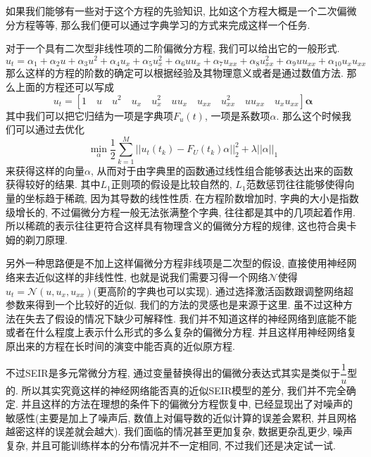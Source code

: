 \documentclass[lang=cn,11pt]{elegantpaper}
\begin{document}
如果我们能够有一些对于这个方程的先验知识, 比如这个方程大概是一个二次偏微分方程等等, 那么我们便可以通过字典学习的方式来完成这样一个任务.

对于一个具有二次型非线性项的二阶偏微分方程, 我们可以给出它的一般形式.
\large
\begin{equation}
	u_t=\alpha_1+\alpha_2u+\alpha_3u^2+\alpha_4u_x+\alpha_5u_x^2+\alpha_6uu_x+\alpha_7u_{xx}+\alpha_8u_{xx}^2+\alpha_9uu_{xx}+\alpha_{10}u_xu_{xx}
\end{equation}
\normalsize
那么这样的方程的阶数的确定可以根据经验及其物理意义或者是通过数值方法. 那么上面的方程还可以写成
\large
\begin{equation}
	u_t=[1\quad u\quad u^2\quad u_x\quad u_x^2\quad uu_x\quad u_{xx}\quad u_{xx}^2\quad uu_{xx}\quad u_xu_{xx}] \mathbf \alpha
\end{equation}
\normalsize
其中我们可以把它归结为一项是字典项$F_u(t)$, 一项是系数项$\alpha$. 那么这个时候我们可以通过去优化
\large
\begin{equation}
	\min_\alpha \dfrac{1}{2}\sum_{k=1}^M ||u_t(t_k)-F_U(t_k)\alpha||_2^2+\lambda||\alpha||_1
\end{equation}
\normalsize
来获得这样的向量$\alpha$, 从而对于由字典里的函数通过线性组合能够表达出来的函数获得较好的结果. 其中$L_1$正则项的假设是比较自然的, $L_1$范数惩罚往往能够使得向量的坐标趋于稀疏, 因为其导数的线性性质. 在方程阶数增加时, 字典的大小是指数级增长的, 不过偏微分方程一般无法张满整个字典, 往往都是其中的几项起着作用. 所以稀疏的表示往往更符合这样具有物理含义的偏微分方程的规律, 这也符合奥卡姆的剃刀原理.

另外一种思路便是不加上这样偏微分方程非线项是二次型的假设, 直接使用神经网络来去近似这样的非线性性, 也就是说我们需要习得一个网络$\mathcal N$使得$u_t=\mathcal N(u,u_x,u_{xx})$(更高阶的字典也可以实现). 通过选择激活函数跟调整网络超参数来得到一个比较好的近似. 我们的方法的灵感也是来源于这里. 虽不过这种方法在失去了假设的情况下缺少可解释性. 我们并不知道这样的神经网络到底能不能或者在什么程度上表示什么形式的多么复杂的偏微分方程. 并且这样用神经网络复原出来的方程在长时间的演变中能否真的近似原方程. 

不过SEIR是多元常微分方程, 通过变量替换得出的偏微分表达式其实是类似于$\dfrac{1}{u}$型的. 所以其实究竟这样的神经网络能否真的近似SEIR模型的差分, 我们并不完全确定. 并且这样的方法在理想的条件下的偏微分方程恢复中, 已经显现出了对噪声的敏感性(主要是加上了噪声后, 数值上对偏导数的近似计算的误差会累积, 并且网格越密这样的误差就会越大). 我们面临的情况甚至更加复杂, 数据更杂乱更少, 噪声复杂, 并且可能训练样本的分布情况并不一定相同, 不过我们还是决定试一试.
\end{document}
